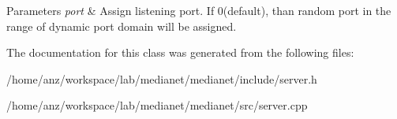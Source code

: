\begin{DoxyParams}{Parameters}
{\em port} & Assign listening port. If 0(default), than random port in the range of dynamic port domain will be assigned. \\
\hline
\end{DoxyParams}


The documentation for this class was generated from the following files\+:\begin{DoxyCompactItemize}
\item 
/home/anz/workspace/lab/medianet/medianet/include/server.\+h\item 
/home/anz/workspace/lab/medianet/medianet/src/server.\+cpp\end{DoxyCompactItemize}
